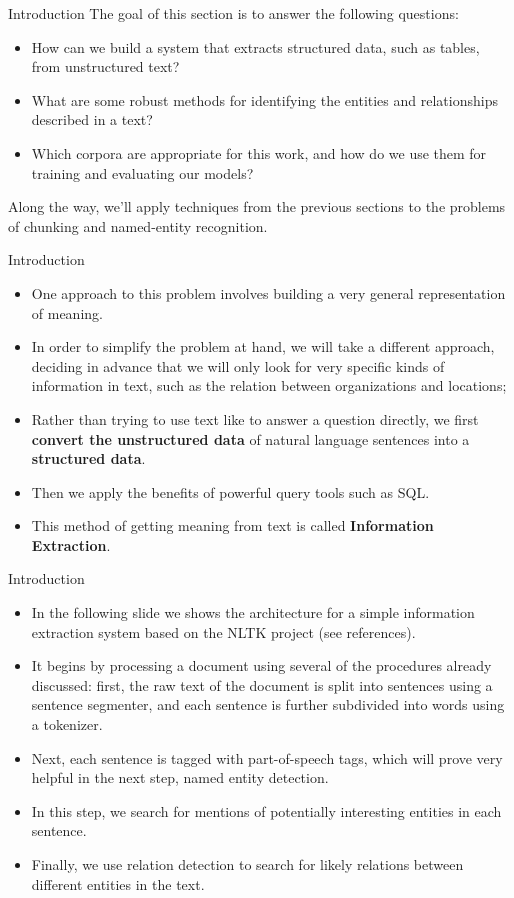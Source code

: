 \documentclass[11pt]{beamer}
\begin{document}
\begin{frame}{Introduction}
The goal of this section is to answer the following questions:
	\begin{itemize}
		\item How can we build a system that extracts structured data, such as tables, from unstructured text?
		\item What are some robust methods for identifying the entities and relationships described in a text?
		\item Which corpora are appropriate for this work, and how do we use them for training and evaluating our models?
	\end{itemize}
Along the way, we'll apply techniques from the previous sections to the problems of chunking and named-entity recognition.
\end{frame}
\begin{frame}{Introduction}
	\begin{itemize}
		\item One approach to this problem involves building a very general representation of meaning. 
		\item In order to simplify the problem at hand, we will take a different approach, deciding in advance that we will only look for very specific kinds of information in text, such as the relation between organizations and locations;
		\item Rather than trying to use text like to answer a question directly, we first \textbf{convert the unstructured data} of natural language sentences into a \textbf{structured data}. 
		\item Then we apply the benefits of powerful query tools such as SQL. 
		\item This method of getting meaning from text is called \textbf{Information Extraction}.
	\end{itemize}
\end{frame}
\begin{frame}{Introduction}
	\begin{itemize}
		\item In the following slide we shows the architecture for a simple information extraction system based on the NLTK project (see references). 
		\item It begins by processing a document using several of the procedures already discussed: first, the raw text of the document is split into sentences using a sentence segmenter, and each sentence is further subdivided into words using a tokenizer. 
		\item Next, each sentence is tagged with part-of-speech tags, which will prove very helpful in the next step, named entity detection. 
		\item In this step, we search for mentions of potentially interesting entities in each sentence. 
		\item Finally, we use relation detection to search for likely relations between different entities in the text.
	\end{itemize}
\end{frame}
\end{document}
